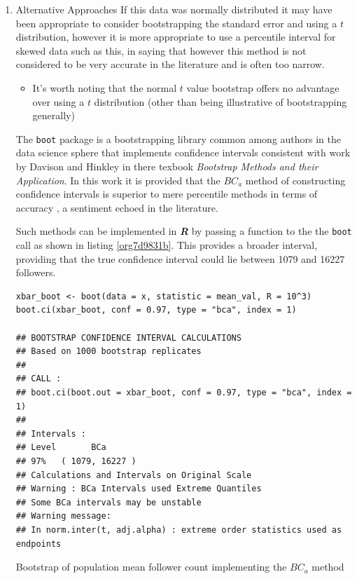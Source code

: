 \documentclass[11pt]{article}
\begin{document}
\begin{enumerate}
\item Alternative Approaches
\label{sec:orgd753a49}
If this data was normally distributed it may have been appropriate to consider
bootstrapping the standard error and using a \(t\) distribution, however it is more appropriate to use a
percentile interval for skewed data such as this, in saying that however this method is not considered to be very accurate in the literature and is often too narrow. \cite[Section 4.1]{hesterberg2015}

\begin{itemize}
\item It's worth noting that the normal \(t\) value bootstrap offers no advantage over
using a \(t\) distribution (other than being illustrative of bootstrapping
generally) \cite[Section 4.1]{hesterberg2015}
\end{itemize}


 The \texttt{boot} package is a bootstrapping library common among authors in the data science sphere
 \cite[p. 295]{james2013} \cite[p. 237]{wiley2019} that implements
 confidence intervals consistent with work by Davison and Hinkley
 \cite{ripley2020} in there texbook \emph{Bootstrap Methods and their Application}.
In this work it is provided that the \(BC_{a}\) method of constructing confidence
 intervals is  superior to mere percentile
 methods in terms of accuracy \cite[Ch. 5]{davison1997}, a sentiment echoed in the literature. \cite[Ch. 5]{carpenter2000,davison1997}

Such methods can be implemented in \textbf{\emph{R}} by passing a function to the the \texttt{boot} call as shown in listing \ref{org7d9831b}. This provides a broader interval, providing that the true confidence interval could lie between 1079 and 16227 followers.

\begin{listing}[htbp]
\begin{verbatim}
xbar_boot <- boot(data = x, statistic = mean_val, R = 10^3)
boot.ci(xbar_boot, conf = 0.97, type = "bca", index = 1)

## BOOTSTRAP CONFIDENCE INTERVAL CALCULATIONS
## Based on 1000 bootstrap replicates
##
## CALL :
## boot.ci(boot.out = xbar_boot, conf = 0.97, type = "bca", index = 1)
##
## Intervals :
## Level       BCa
## 97%   ( 1079, 16227 )
## Calculations and Intervals on Original Scale
## Warning : BCa Intervals used Extreme Quantiles
## Some BCa intervals may be unstable
## Warning message:
## In norm.inter(t, adj.alpha) : extreme order statistics used as endpoints
\end{verbatim}
\caption{\label{org7d9831b}Bootstrap of population mean follower count implementing the \(BC_{a}\) method}
\end{listing}

\label{org0738fac}


\label{org0be2314}
 
\end{enumerate}
\end{document}
